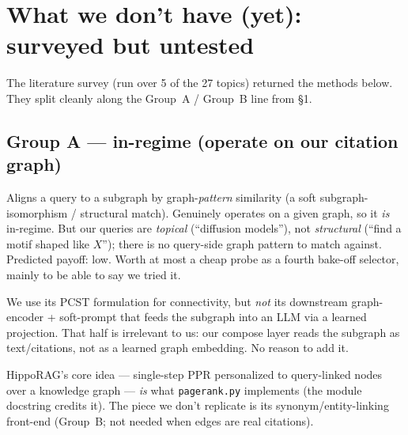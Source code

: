 \documentclass[11pt]{article}
\newcommand{\g}[1]{\textcolor{good}{#1}}
\newcommand{\md}[1]{\textcolor{mid}{#1}}
\newcommand{\code}[1]{\texttt{\small #1}}
\newcommand{\arxiv}[1]{\href{https://arxiv.org/abs/#1}{\texttt{#1}}}
\begin{document}
\section{What we don't have (yet): surveyed but untested}

The literature survey (run over 5 of the 27 topics) returned the methods below. They split cleanly
along the Group~A / Group~B line from \S1.

\subsection{Group A --- in-regime (operate on our citation graph)}
\begin{description}[leftmargin=0pt,itemsep=4pt]
  \item[SimGRAG (\arxiv{2412.15272}) --- \md{untested, marginal fit}.] Aligns a query to a subgraph
  by graph-\emph{pattern} similarity (a soft subgraph-isomorphism / structural match). Genuinely
  operates on a given graph, so it \emph{is} in-regime. But our queries are \emph{topical}
  (``diffusion models''), not \emph{structural} (``find a motif shaped like $X$''); there is no
  query-side graph pattern to match against. Predicted payoff: low. Worth at most a cheap probe as a
  fourth bake-off selector, mainly to be able to say we tried it.
  \item[Full G-Retriever objective (\arxiv{2402.07630}) --- \md{partially tested}.] We use its PCST
  formulation for connectivity, but \emph{not} its downstream graph-encoder + soft-prompt that feeds
  the subgraph into an LLM via a learned projection. That half is irrelevant to us: our compose layer
  reads the subgraph as text/citations, not as a learned graph embedding. No reason to add it.
  \item[HippoRAG-style PPR (\arxiv{2405.14831}) --- \g{effectively already adopted}.] HippoRAG's core
  idea --- single-step PPR personalized to query-linked nodes over a knowledge graph --- \emph{is}
  what \code{pagerank.py} implements (the module docstring credits it). The piece we don't replicate
  is its synonym/entity-linking front-end (Group~B; not needed when edges are real citations).
\end{description}
\end{document}
